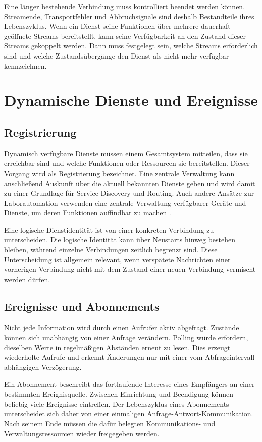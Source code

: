 Eine länger bestehende Verbindung muss kontrolliert beendet werden können. Streamende, Transportfehler und Abbruchsignale sind deshalb Bestandteile ihres Lebenszyklus. Wenn ein Dienst seine Funktionen über mehrere dauerhaft geöffnete Streams bereitstellt, kann seine Verfügbarkeit an den Zustand dieser Streams gekoppelt werden. Dann muss festgelegt sein, welche Streams erforderlich sind und welche Zustandsübergänge den Dienst als nicht mehr verfügbar kennzeichnen.

\section{Dynamische Dienste und Ereignisse}

\subsection{Registrierung}

Dynamisch verfügbare Dienste müssen einem Gesamtsystem mitteilen, dass sie erreichbar sind und welche Funktionen oder Ressourcen sie bereitstellen. Dieser Vorgang wird als Registrierung bezeichnet. Eine zentrale Verwaltung kann anschließend Auskunft über die aktuell bekannten Dienste geben und wird damit zu einer Grundlage für Service Discovery und Routing. Auch andere Ansätze zur Laborautomation verwenden eine zentrale Verwaltung verfügbarer Geräte und Dienste, um deren Funktionen auffindbar zu machen \cite{bromig2022sila}.

Eine logische Dienstidentität ist von einer konkreten Verbindung zu unterscheiden. Die logische Identität kann über Neustarts hinweg bestehen bleiben, während einzelne Verbindungen zeitlich begrenzt sind. Diese Unterscheidung ist allgemein relevant, wenn verspätete Nachrichten einer vorherigen Verbindung nicht mit dem Zustand einer neuen Verbindung vermischt werden dürfen.

\subsection{Ereignisse und Abonnements}

Nicht jede Information wird durch einen Aufrufer aktiv abgefragt. Zustände können sich unabhängig von einer Anfrage verändern. Polling würde erfordern, dieselben Werte in regelmäßigen Abständen erneut zu lesen. Dies erzeugt wiederholte Aufrufe und erkennt Änderungen nur mit einer vom Abfrageintervall abhängigen Verzögerung.

Ein Abonnement beschreibt das fortlaufende Interesse eines Empfängers an einer bestimmten Ereignisquelle. Zwischen Einrichtung und Beendigung können beliebig viele Ereignisse eintreffen. Der Lebenszyklus eines Abonnements unterscheidet sich daher von einer einmaligen Anfrage-Antwort-Kommunikation. Nach seinem Ende müssen die dafür belegten Kommunikations- und Verwaltungsressourcen wieder freigegeben werden.

